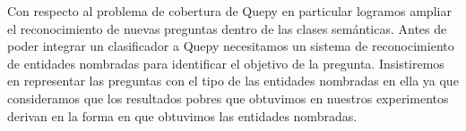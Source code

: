 
Con respecto al problema de cobertura de Quepy en particular logramos ampliar el reconocimiento de nuevas preguntas dentro de las clases semánticas. Antes de poder integrar un clasificador a Quepy necesitamos un sistema de reconocimiento de entidades nombradas para identificar el objetivo de la pregunta. Insistiremos en representar las preguntas con el tipo de las entidades nombradas en ella ya que consideramos que los resultados pobres que obtuvimos en nuestros experimentos derivan en la forma en que obtuvimos las entidades nombradas.


